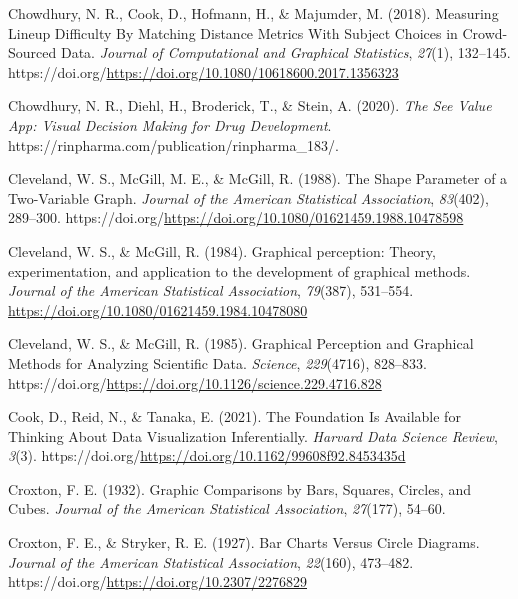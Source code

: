 \documentclass[
  10pt,
]{article}
\newlength{\cslhangindent}
\newenvironment{CSLReferences}[2] %
 {\begin{list}{}{%
  \setlength{\itemindent}{0pt}
  \setlength{\leftmargin}{0pt}
  \setlength{\parsep}{0pt}
  \ifodd #1
   \setlength{\leftmargin}{\cslhangindent}
   \setlength{\itemindent}{-1\cslhangindent}
  \fi
  \setlength{\itemsep}{#2\baselineskip}}}
 {\end{list}}
\begin{document}
\begin{CSLReferences}{1}{0}
Chowdhury, N. R., Cook, D., Hofmann, H., \& Majumder, M. (2018).
Measuring Lineup Difficulty By Matching Distance Metrics With Subject
Choices in Crowd-Sourced Data. \emph{Journal of Computational and
Graphical Statistics}, \emph{27}(1), 132--145.
https://doi.org/\url{https://doi.org/10.1080/10618600.2017.1356323}

Chowdhury, N. R., Diehl, H., Broderick, T., \& Stein, A. (2020).
\emph{The {See} {Value} {App}: {Visual} {Decision} {Making} for {Drug}
{Development}}. https://rinpharma.com/publication/rinpharma\_183/.

Cleveland, W. S., McGill, M. E., \& McGill, R. (1988). The {Shape}
{Parameter} of a {Two}-{Variable} {Graph}. \emph{Journal of the American
Statistical Association}, \emph{83}(402), 289--300.
https://doi.org/\url{https://doi.org/10.1080/01621459.1988.10478598}

Cleveland, W. S., \& McGill, R. (1984). Graphical perception: {Theory},
experimentation, and application to the development of graphical
methods. \emph{Journal of the American Statistical Association},
\emph{79}(387), 531--554.
\url{https://doi.org/10.1080/01621459.1984.10478080}

Cleveland, W. S., \& McGill, R. (1985). Graphical {Perception} and
{Graphical} {Methods} for {Analyzing} {Scientific} {Data}.
\emph{Science}, \emph{229}(4716), 828--833.
https://doi.org/\url{https://doi.org/10.1126/science.229.4716.828}

Cook, D., Reid, N., \& Tanaka, E. (2021). The {Foundation} {Is}
{Available} for {Thinking} {About} {Data} {Visualization}
{Inferentially}. \emph{Harvard Data Science Review}, \emph{3}(3).
https://doi.org/\url{https://doi.org/10.1162/99608f92.8453435d}

Croxton, F. E. (1932). Graphic {Comparisons} by {Bars}, {Squares},
{Circles}, and {Cubes}. \emph{Journal of the American Statistical
Association}, \emph{27}(177), 54--60.

Croxton, F. E., \& Stryker, R. E. (1927). Bar {Charts} {Versus} {Circle}
{Diagrams}. \emph{Journal of the American Statistical Association},
\emph{22}(160), 473--482.
https://doi.org/\url{https://doi.org/10.2307/2276829}


\end{CSLReferences}
\end{document}
